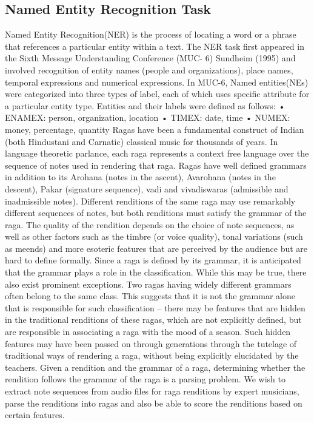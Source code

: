 \documentclass[12pt,a4paper]{article}
\begin{document}
\subsection{Named Entity Recognition Task}
Named Entity Recognition(NER) is the process of locating a word or a phrase that references a particular
entity within a text. The NER task first appeared in the Sixth Message Understanding Conference (MUC-
6) Sundheim (1995) and involved recognition of entity names (people and organizations), place names,
temporal expressions and numerical expressions.
In MUC-6, Named entities(NEs) were categorized into three types of label, each of which uses specific
attribute for a particular entity type. Entities and their labels were defined as follows:
• ENAMEX: person, organization, location
• TIMEX: date, time
• NUMEX: money, percentage, quantity
Ragas have been a fundamental construct of Indian (both Hindustani and Carnatic) classical music for thousands of years. In language theoretic parlance, each raga represents a context free language over the sequence of notes used in rendering that raga. Ragas have well defined grammars in addition to its Arohana (notes in the ascent), Avarohana (notes in the descent), Pakar (signature sequence), vadi and vivadiswaras (admissible and inadmissible notes). Different renditions of the same raga may use remarkably different sequences of notes, but both renditions must satisfy the grammar of the raga. The quality of the rendition depends on the choice of note sequences, as well as other factors such as the timbre (or voice quality), tonal variations (such as meends) and more esoteric features that are perceived by the audience but are hard to define formally. Since a raga is defined by its grammar, it is anticipated that the grammar plays a role in the classification. While this may be true, there also exist prominent exceptions. Two ragas having widely different grammars often belong to the same class. This suggests that it is not the grammar alone that is responsible for such classification – there may be features that are hidden in the traditional renditions of these ragas, which are not explicitly defined, but are responsible in associating a raga with the mood of a season. Such hidden features may have been passed on through generations through the tutelage of traditional ways of rendering a raga, without being explicitly elucidated by the teachers.
Given a rendition and the grammar of a raga, determining whether the rendition follows the grammar of the raga is a parsing problem. 
We wish to extract note sequences from audio files for raga renditions by expert musicians, parse the renditions into ragas and also be able to score the renditions based on certain features. \\
\end{document}
